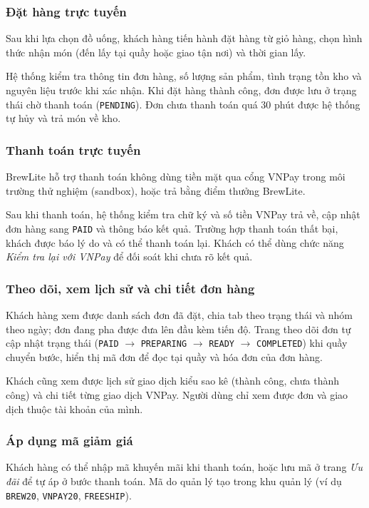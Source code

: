 \documentclass[12pt,a4paper]{article}
\begin{document}
\subsubsection{Đặt hàng trực tuyến}
Sau khi lựa chọn đồ uống, khách hàng tiến hành đặt hàng từ giỏ hàng, chọn hình thức nhận món (đến lấy tại quầy hoặc giao tận nơi) và thời gian lấy.

Hệ thống kiểm tra thông tin đơn hàng, số lượng sản phẩm, tình trạng tồn kho và nguyên liệu trước khi xác nhận. Khi đặt hàng thành công, đơn được lưu ở trạng thái chờ thanh toán (\texttt{PENDING}). Đơn chưa thanh toán quá 30 phút được hệ thống tự hủy và trả món về kho.

\subsubsection{Thanh toán trực tuyến}
BrewLite hỗ trợ thanh toán không dùng tiền mặt qua cổng VNPay trong môi trường thử nghiệm (sandbox), hoặc trả bằng điểm thưởng BrewLite.

Sau khi thanh toán, hệ thống kiểm tra chữ ký và số tiền VNPay trả về, cập nhật đơn hàng sang \texttt{PAID} và thông báo kết quả. Trường hợp thanh toán thất bại, khách được báo lý do và có thể thanh toán lại. Khách có thể dùng chức năng \textit{Kiểm tra lại với VNPay} để đối soát khi chưa rõ kết quả.

\subsubsection{Theo dõi, xem lịch sử và chi tiết đơn hàng}
Khách hàng xem được danh sách đơn đã đặt, chia tab theo trạng thái và nhóm theo ngày; đơn đang pha được đưa lên đầu kèm tiến độ. Trang theo dõi đơn tự cập nhật trạng thái (\texttt{PAID} $\rightarrow$ \texttt{PREPARING} $\rightarrow$ \texttt{READY} $\rightarrow$ \texttt{COMPLETED}) khi quầy chuyển bước, hiển thị mã đơn để đọc tại quầy và hóa đơn của đơn hàng.

Khách cũng xem được lịch sử giao dịch kiểu sao kê (thành công, chưa thành công) và chi tiết từng giao dịch VNPay. Người dùng chỉ xem được đơn và giao dịch thuộc tài khoản của mình.

\subsubsection{Áp dụng mã giảm giá}
Khách hàng có thể nhập mã khuyến mãi khi thanh toán, hoặc lưu mã ở trang \textit{Ưu đãi} để tự áp ở bước thanh toán. Mã do quản lý tạo trong khu quản lý (ví dụ \texttt{BREW20}, \texttt{VNPAY20}, \texttt{FREESHIP}).
\end{document}
